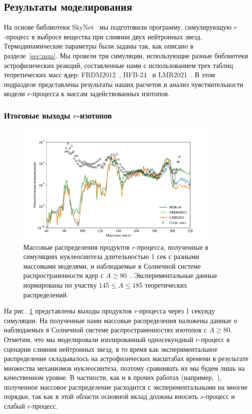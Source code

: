 \subsection{Результаты моделирования}
На основе библиотеки SkyNet~\cite{lippuner2017} мы подготовили программу, симулирующую $r$-процесс в выбросе вещества при слиянии двух нейтронных звезд. Термодинамические параметры были заданы так, как описано в разделе~\ref{sec:nsm}. Мы провели три симуляции, использующие разные библиотеки астрофизических реакций, составленные нами с использованием трех таблиц теоретических масс ядер: FRDM2012~\cite{moller2016}, HFB-24~\cite{goriely2013} и LMR2021~\cite{vladimirova2022}. В этом подразделе представлены результаты наших расчетов и анализ чувствительности модели $r$-процесса к массам задействованных изотопов.

\subsubsection{Итоговые выходы $r$-изотопов}

\begin{figure}
\centering
\includegraphics[width=0.9\textwidth]{../pics/distr.pdf}
\caption{Массовые распределения продуктов $r$-процесса, полученные в симуляциях нуклеосинтеза длительностью 1 сек с разными массовыми моделями, и наблюдаемые в Солнечной системе распространенности ядер с $A \geq 80$~\cite{lodders2003}. Экспериментальные данные нормированы по участку $145 \leq A \leq 185$ теоретических распределений.}
\label{fig:distr}
\end{figure}

На рис.~\ref{fig:distr} представлены выходы продуктов $r$-процесса через 1 секунду симуляции. На полученные нами массовые распределения наложены данные о наблюдаемых в Солнечной системе распространенностях изотопов с $A \geq 80$. Отметим, что мы моделировали изолированный односекундный $r$-процесс в сценарии слияния нейтронных звезд, в то время как экспериментальное распределение складывалось на астрофизических масштабах времени в результате множества механизмов нуклеосинтеза, поэтому сравнивать их мы будем лишь на качественном уровне. В частности, как и в прочих работах (например,~\cite{goriely2011}), полученное массовое распределение расходится с экспериментальными на многие порядки, так как в этой области основной вклад должны вносить $s$-процесс и слабый $r$-процесс.

